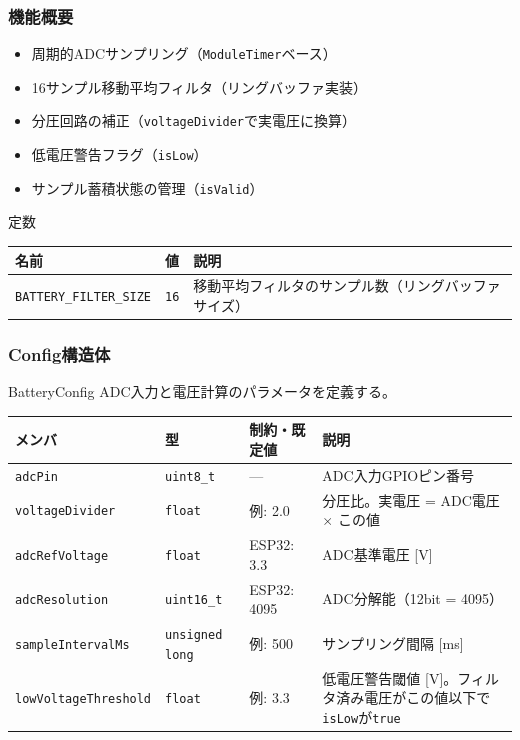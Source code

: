\subsubsection{機能概要}

\begin{itemize}
    \item 周期的ADCサンプリング（\texttt{ModuleTimer}ベース）
    \item 16サンプル移動平均フィルタ（リングバッファ実装）
    \item 分圧回路の補正（\texttt{voltageDivider}で実電圧に換算）
    \item 低電圧警告フラグ（\texttt{isLow}）
    \item サンプル蓄積状態の管理（\texttt{isValid}）
\end{itemize}

\begin{funcblock}{定数}
\begin{tabularx}{\textwidth}{l l X}
\toprule
\textbf{名前} & \textbf{値} & \textbf{説明} \\
\midrule
\texttt{BATTERY\_FILTER\_SIZE} & \texttt{16} & 移動平均フィルタのサンプル数（リングバッファサイズ） \\
\bottomrule
\end{tabularx}
\end{funcblock}

\subsubsection{Config構造体}

\begin{funcblock}{BatteryConfig}
ADC入力と電圧計算のパラメータを定義する。

\begin{longtable}{l l l p{4.5cm}}
\toprule
\textbf{メンバ} & \textbf{型} & \textbf{制約・既定値} & \textbf{説明} \\
\midrule
\endhead
\texttt{adcPin}             & \texttt{uint8\_t}       & ---           & ADC入力GPIOピン番号 \\
\texttt{voltageDivider}     & \texttt{float}          & 例: 2.0       & 分圧比。実電圧 = ADC電圧 $\times$ この値 \\
\texttt{adcRefVoltage}      & \texttt{float}          & ESP32: 3.3    & ADC基準電圧 [V] \\
\texttt{adcResolution}      & \texttt{uint16\_t}      & ESP32: 4095   & ADC分解能（12bit = 4095） \\
\texttt{sampleIntervalMs}   & \texttt{unsigned long}  & 例: 500       & サンプリング間隔 [ms] \\
\texttt{lowVoltageThreshold} & \texttt{float}         & 例: 3.3       & 低電圧警告閾値 [V]。フィルタ済み電圧がこの値以下で\texttt{isLow}が\texttt{true} \\
\bottomrule
\end{longtable}
\end{funcblock}

